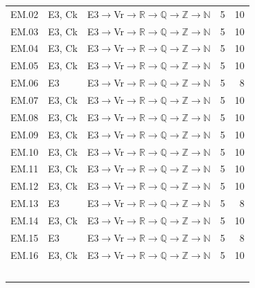 {\begin{longtable}{l p{4.6cm} p{7.4cm} r r}
EM.02 & \textsf{E3}, \textsf{Ck} & \textsf{E3}$\to$\textsf{Vr}$\to$$\mathbb R$$\to$$\mathbb Q$$\to$$\mathbb Z$$\to$$\mathbb N$ & 5 & 10 \\
EM.03 & \textsf{E3}, \textsf{Ck} & \textsf{E3}$\to$\textsf{Vr}$\to$$\mathbb R$$\to$$\mathbb Q$$\to$$\mathbb Z$$\to$$\mathbb N$ & 5 & 10 \\
EM.04 & \textsf{E3}, \textsf{Ck} & \textsf{E3}$\to$\textsf{Vr}$\to$$\mathbb R$$\to$$\mathbb Q$$\to$$\mathbb Z$$\to$$\mathbb N$ & 5 & 10 \\
EM.05 & \textsf{E3}, \textsf{Ck} & \textsf{E3}$\to$\textsf{Vr}$\to$$\mathbb R$$\to$$\mathbb Q$$\to$$\mathbb Z$$\to$$\mathbb N$ & 5 & 10 \\
EM.06 & \textsf{E3} & \textsf{E3}$\to$\textsf{Vr}$\to$$\mathbb R$$\to$$\mathbb Q$$\to$$\mathbb Z$$\to$$\mathbb N$ & 5 & 8 \\
EM.07 & \textsf{E3}, \textsf{Ck} & \textsf{E3}$\to$\textsf{Vr}$\to$$\mathbb R$$\to$$\mathbb Q$$\to$$\mathbb Z$$\to$$\mathbb N$ & 5 & 10 \\
EM.08 & \textsf{E3}, \textsf{Ck} & \textsf{E3}$\to$\textsf{Vr}$\to$$\mathbb R$$\to$$\mathbb Q$$\to$$\mathbb Z$$\to$$\mathbb N$ & 5 & 10 \\
EM.09 & \textsf{E3}, \textsf{Ck} & \textsf{E3}$\to$\textsf{Vr}$\to$$\mathbb R$$\to$$\mathbb Q$$\to$$\mathbb Z$$\to$$\mathbb N$ & 5 & 10 \\
EM.10 & \textsf{E3}, \textsf{Ck} & \textsf{E3}$\to$\textsf{Vr}$\to$$\mathbb R$$\to$$\mathbb Q$$\to$$\mathbb Z$$\to$$\mathbb N$ & 5 & 10 \\
EM.11 & \textsf{E3}, \textsf{Ck} & \textsf{E3}$\to$\textsf{Vr}$\to$$\mathbb R$$\to$$\mathbb Q$$\to$$\mathbb Z$$\to$$\mathbb N$ & 5 & 10 \\
EM.12 & \textsf{E3}, \textsf{Ck} & \textsf{E3}$\to$\textsf{Vr}$\to$$\mathbb R$$\to$$\mathbb Q$$\to$$\mathbb Z$$\to$$\mathbb N$ & 5 & 10 \\
EM.13 & \textsf{E3} & \textsf{E3}$\to$\textsf{Vr}$\to$$\mathbb R$$\to$$\mathbb Q$$\to$$\mathbb Z$$\to$$\mathbb N$ & 5 & 8 \\
EM.14 & \textsf{E3}, \textsf{Ck} & \textsf{E3}$\to$\textsf{Vr}$\to$$\mathbb R$$\to$$\mathbb Q$$\to$$\mathbb Z$$\to$$\mathbb N$ & 5 & 10 \\
EM.15 & \textsf{E3} & \textsf{E3}$\to$\textsf{Vr}$\to$$\mathbb R$$\to$$\mathbb Q$$\to$$\mathbb Z$$\to$$\mathbb N$ & 5 & 8 \\
EM.16 & \textsf{E3}, \textsf{Ck} & \textsf{E3}$\to$\textsf{Vr}$\to$$\mathbb R$$\to$$\mathbb Q$$\to$$\mathbb Z$$\to$$\mathbb N$ & 5 & 10 \\
$$
\end{longtable}}
